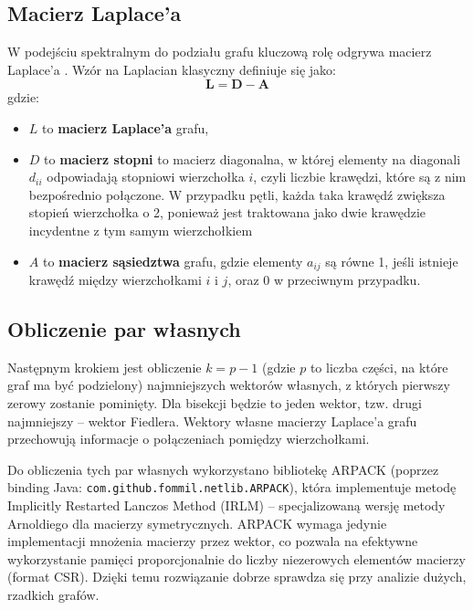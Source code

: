 \documentclass{article}
\begin{document}
    \subsection{Macierz Laplace'a}
    
    W podejściu spektralnym do podziału grafu kluczową rolę odgrywa macierz Laplace'a \cite{laplacian_matrix}.
    Wzór na Laplacian klasyczny definiuje się jako:
    \[
    \mathbf{L} = \mathbf{D} - \mathbf{A}
    \]
    gdzie:
    \begin{itemize}
      \item \( L \) to \textbf{macierz Laplace'a} grafu,
      \item \( D \) to \textbf{macierz stopni} to macierz diagonalna, w której elementy na diagonali \( d_{ii} \) odpowiadają stopniowi wierzchołka \( i \), czyli liczbie krawędzi, które są z nim bezpośrednio połączone. W przypadku pętli, każda taka krawędź zwiększa stopień wierzchołka o 2, ponieważ jest traktowana jako dwie krawędzie incydentne z tym samym wierzchołkiem
      \item \( A \) to \textbf{macierz sąsiedztwa} grafu, gdzie elementy \( a_{ij} \) są równe 1, jeśli istnieje krawędź między wierzchołkami \( i \) i \( j \), oraz 0 w przeciwnym przypadku.
    \end{itemize}

    

    \subsection{Obliczenie par własnych}

    Następnym krokiem jest obliczenie \(k = p - 1\) (gdzie \(p\) to liczba części, na które graf ma być podzielony) najmniejszych wektorów własnych, z których pierwszy zerowy zostanie pominięty. Dla bisekcji będzie to jeden wektor, tzw. drugi najmniejszy – wektor Fiedlera. Wektory własne macierzy Laplace'a grafu przechowują informacje o połączeniach pomiędzy wierzchołkami.
    
    Do obliczenia tych par własnych wykorzystano bibliotekę ARPACK (poprzez binding Java: \texttt{com.github.fommil.netlib.ARPACK}), która implementuje metodę Implicitly Restarted Lanczos Method (IRLM) – specjalizowaną wersję metody Arnoldiego dla macierzy symetrycznych. ARPACK wymaga jedynie implementacji mnożenia macierzy przez wektor, co pozwala na efektywne wykorzystanie pamięci proporcjonalnie do liczby niezerowych elementów macierzy (format CSR). Dzięki temu rozwiązanie dobrze sprawdza się przy analizie dużych, rzadkich grafów.
\end{document}
